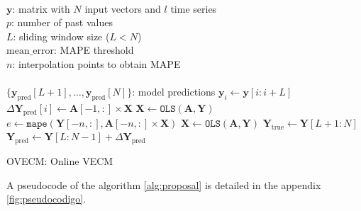 \begin{algorithm}[ht]
\begin{algorithmic}[1]
\REQUIRE $\,$ \\
$\mathbf{y}$: matrix with $N$ input vectors and $l$ time series\\
$p$: number of past values \\
$L$: sliding window size ($L<N$) \\
$\text{mean\_error}$: MAPE threshold \\
$n$: interpolation points to obtain MAPE \\
\ENSURE  $\,$ \\
$\{\mathbf{y}_{\text{pred}}[L+1],\dots,\mathbf{y}_{\text{pred}}[N]\}$: model predictions 
    \STATE $\mathbf{y}_i \gets \mathbf{y}[i:i+L]$
	\ELSE
        \STATE $\Delta \mathbf{Y}_{\text{pred}}[i] \gets \mathbf{A}[-1,:] \times \mathbf{X}$
    \ENDIF
    \STATE $\mathbf{X} \gets \texttt{OLS} (\mathbf{A},\mathbf{Y})$
    \STATE $e \gets \texttt{mape}(\mathbf{Y}[-n,:],\mathbf{A}[-n,:] \times \mathbf{X})$
        \STATE $\mathbf{X} \gets \texttt{OLS} (\mathbf{A},\mathbf{Y})$
    \ENDIF
\ENDFOR
\STATE $\mathbf{Y}_{\text{true}} \gets \mathbf{Y}[L+1:N]$
\STATE $\mathbf{Y}_{\text{pred}}\gets 
\mathbf{Y}[L:N-1] +\Delta \mathbf{Y}_{\text{pred}}$
\end{algorithmic}
\caption{OVECM: Online VECM}
\label{alg:proposal}
\end{algorithm}

A pseudocode of the algorithm \ref{alg:proposal} is detailed in the appendix \ref{fig:pseudocodigo}.

